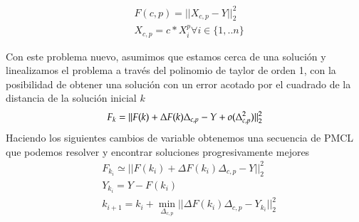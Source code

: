 \documentclass{endm}
\begin{document}
\begin{align*}
&F(c,p) =||X_{c,p} - Y||^2_2 \\
&X_{c,p} = c*X_i^p \forall i \in \{1,..n\}
\end{align*}

Con este problema nuevo, asumimos que estamos cerca de una solución y linealizamos el problema a través del polinomio de taylor de orden 1, con la posibilidad de obtener una solución con un error acotado por el cuadrado de la distancia de la solución inicial $k$
\begin{equation*}
F_k = ||  F(k) + \Delta F(k)\Delta_{c,p} - Y + o(\Delta_{c,p}^2)||^2_2\\
\end{equation*}
Haciendo los siguientes cambios de variable obtenemos una secuencia de PMCL que podemos resolver y encontrar soluciones progresivamente mejores
\begin{align*}
&F_{k_i} \simeq || F(k_i) + \Delta F(k_i)\Delta_{c,p} - Y||^2_2\\
&Y_{k_i} = Y - F(k_i) \\
&k_{i+1} = k_i + \min_{\Delta_{c,p}} || \Delta F(k_i)\Delta_{c,p} - Y_{k_i} ||^2_2
\end{align*}



\end{document}
